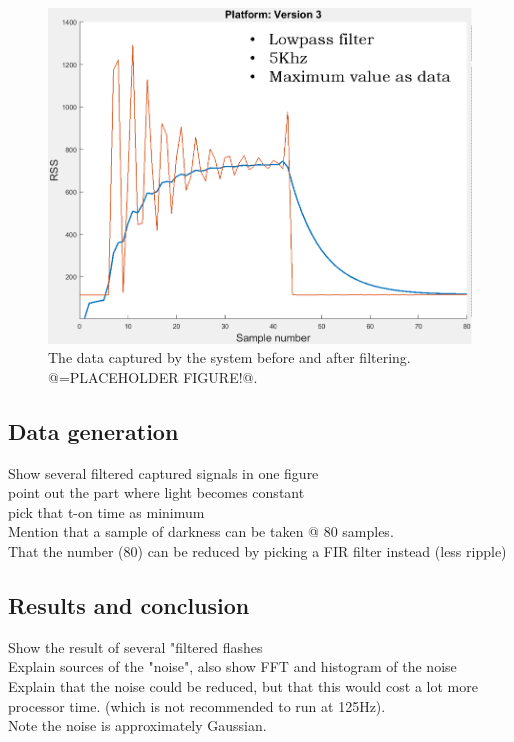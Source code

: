 \begin{figure}[!h]
	\includegraphics[width=\textwidth]{pics/66KhzFilter_placeholder.png}
	\caption{The data captured by the system before and after filtering. @=PLACEHOLDER FIGURE!@.}
	\label{fig:66KhzFilter}
\end{figure}

\subsection{Data generation}
\label{sec:Data_generation}
Show several filtered captured signals in one figure\\
point out the part where light becomes constant\\
pick that t-on time as minimum\\
Mention that a sample of darkness can be taken @ 80 samples.\\
That the number (80) can be reduced by picking a FIR filter instead (less ripple)\\

\subsection{Results and conclusion}
\label{sec:conclusion}
Show the result of several "filtered flashes\\
Explain sources of the "noise", also show FFT and histogram of the noise\\
Explain that the noise could be reduced, but that this would cost a lot more processor time. (which is not recommended to run at 125Hz).\\
Note the noise is approximately Gaussian.

